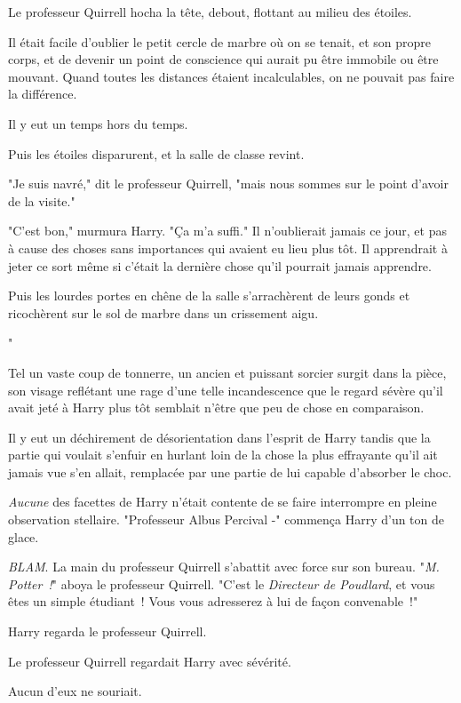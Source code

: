 Le professeur Quirrell hocha la tête, debout, flottant au milieu des étoiles.

Il était facile d'oublier le petit cercle de marbre où on se tenait, et son propre corps, et de devenir un point de conscience qui aurait pu être immobile ou être mouvant. Quand toutes les distances étaient incalculables, on ne pouvait pas faire la différence.

Il y eut un temps hors du temps.

Puis les étoiles disparurent, et la salle de classe revint.

"Je suis navré," dit le professeur Quirrell, "mais nous sommes sur le point d'avoir de la visite."

"C'est bon," murmura Harry. "Ça m'a suffi." Il n'oublierait jamais ce jour, et pas à cause des choses sans importances qui avaient eu lieu plus tôt. Il apprendrait à jeter ce sort même si c'était la dernière chose qu'il pourrait jamais apprendre.

Puis les lourdes portes en chêne de la salle s'arrachèrent de leurs gonds et ricochèrent sur le sol de marbre dans un crissement aigu.

"

Tel un vaste coup de tonnerre, un ancien et puissant sorcier surgit dans la pièce, son visage reflétant une rage d'une telle incandescence que le regard sévère qu'il avait jeté à Harry plus tôt semblait n'être que peu de chose en comparaison.

Il y eut un déchirement de désorientation dans l'esprit de Harry tandis que la partie qui voulait s'enfuir en hurlant loin de la chose la plus effrayante qu'il ait jamais vue s'en allait, remplacée par une partie de lui capable d'absorber le choc.

\emph{Aucune} des facettes de Harry n'était contente de se faire interrompre en pleine observation stellaire. "Professeur Albus Percival -" commença Harry d'un ton de glace.

\emph{BLAM}. La main du professeur Quirrell s'abattit avec force sur son bureau. "\emph{M. Potter~!}" aboya le professeur Quirrell. "C'est le \emph{Directeur de Poudlard}, et vous êtes un simple étudiant~! Vous vous adresserez à lui de façon convenable~!"

Harry regarda le professeur Quirrell.

Le professeur Quirrell regardait Harry avec sévérité.

Aucun d'eux ne souriait.


